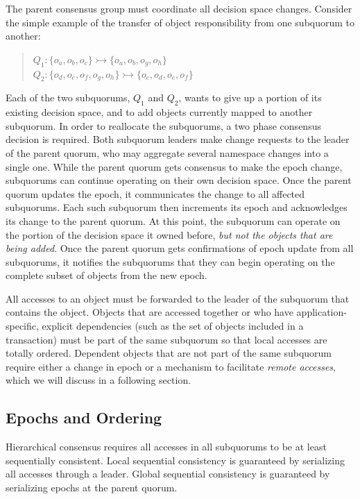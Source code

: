 \documentclass[11pt,letterpaper]{article}
\begin{document}
The parent consensus group must coordinate all decision space changes.
Consider the simple example of the transfer of object responsibility from one subquorum
to another:

\begin{quote}
\small
   $Q_1: \{o_a,o_b,o_c\} \rightarrowtail \{o_a,o_b,o_g,o_h\}$\\
   $Q_2: \{o_d,o_e,o_f,o_g,o_h\} \rightarrowtail \{o_c,o_d,o_e,o_f\}$
\end{quote}

Each of the two subquorums, $Q_1$ and $Q_2$, wants to give up a portion of its
existing decision space, and to add objects currently mapped to another subquorum.
In order to reallocate the subquorums, a two phase consensus decision is required.
Both subquorum leaders make change requests to the leader of the parent quorum, who may
aggregate several namespace changes into a single one.
While the parent quorum gets consensus to make the epoch change, subquorums can continue
operating on their own decision space.
Once the parent quorum updates the epoch, it communicates the change to all affected
subquorums.
Each such subquorum then increments its epoch and acknowledges its change to the parent
quorum.
At this point, the subquorum can operate on the portion of the decision space it owned
before, \emph{but not the objects that are being added}.
Once the parent quorum gets confirmations of epoch update from all subquorums, it notifies
the subquorums that they can begin operating on the complete subset of objects from the
new epoch.

All accesses to an object must be forwarded to the leader of the subquorum that contains
the object.
Objects that are accessed together or who have application-specific, explicit
dependencies (such as the set of objects included in a transaction) must be part of the
same subquorum so that local accesses are totally ordered.
Dependent objects that are not part of the same subquorum require either a change in
epoch or a mechanism to facilitate \emph{remote accesses}, which we will discuss in a
following section.

\subsection{Epochs and Ordering}

Hierarchical consensus requires all accesses in all subquorums to be at least
sequentially consistent.
Local sequential consistency is guaranteed by serializing all accesses through a leader.
Global sequential consistency is guaranteed by serializing epochs at the parent quorum.
\end{document}
